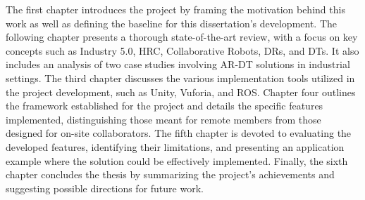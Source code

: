The first chapter introduces the project by framing the motivation behind this work as well as defining the baseline for this dissertation's development. The following chapter presents a thorough state-of-the-art review, with a focus on key concepts such as Industry 5.0, \ac{HRC}, Collaborative Robots, \ac{DRs}, and \ac{DTs}. It also includes an analysis of two case studies involving \ac{AR}-\ac{DT} solutions in industrial settings. The third chapter discusses the various implementation tools utilized in the project development, such as Unity, Vuforia, and ROS.
Chapter four outlines the framework established for the project and details the specific features implemented, distinguishing those meant for remote members from those designed for on-site collaborators. The fifth chapter is devoted to evaluating the developed features, identifying their limitations, and presenting an application example where the solution could be effectively implemented. Finally, the sixth chapter concludes the thesis by summarizing the project's achievements and suggesting possible directions for future work.




